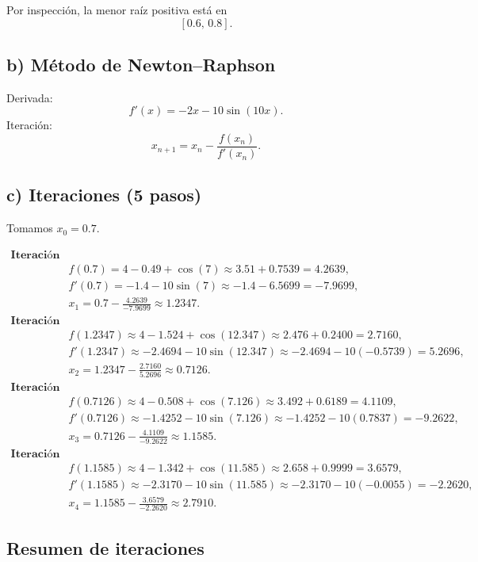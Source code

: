 \documentclass[12pt]{article}
\begin{document}
\begin{center}
Por inspección, la menor raíz positiva está en
\[
\boxed{[0.6,\,0.8]}.
\]

\subsection*{b) Método de Newton–Raphson}

Derivada:
\[
f'(x) = -2x - 10\sin(10x).
\]
Iteración:
\[
x_{n+1} = x_n - \frac{f(x_n)}{f'(x_n)}.
\]

\subsection*{c) Iteraciones (5 pasos)}

Tomamos \(x_0 = 0.7\).  

\begin{align*}
\textbf{Iteración 0:}\\
&f(0.7) = 4 - 0.49 + \cos(7) \approx 3.51 + 0.7539 = 4.2639,\\
&f'(0.7) = -1.4 -10\sin(7)\approx -1.4 - 6.5699 = -7.9699,\\
&x_1 = 0.7 - \frac{4.2639}{-7.9699} \approx 1.2347.\\[0.5em]
\textbf{Iteración 1:}\\
&f(1.2347) \approx 4 -1.524 + \cos(12.347)\approx 2.476 + 0.2400 = 2.7160,\\
&f'(1.2347)\approx -2.4694 -10\sin(12.347)\approx -2.4694 - 10(-0.5739)=5.2696,\\
&x_2 = 1.2347 - \frac{2.7160}{5.2696}\approx 0.7126.\\[0.5em]
\textbf{Iteración 2:}\\
&f(0.7126) \approx 4 -0.508 + \cos(7.126)\approx 3.492 + 0.6189=4.1109,\\
&f'(0.7126)\approx -1.4252 - 10\sin(7.126)\approx -1.4252 -10(0.7837)=-9.2622,\\
&x_3 = 0.7126 - \frac{4.1109}{-9.2622}\approx 1.1585.\\[0.5em]
\textbf{Iteración 3:}\\
&f(1.1585)\approx 4 -1.342 + \cos(11.585)\approx 2.658 + 0.9999=3.6579,\\
&f'(1.1585)\approx -2.3170 -10\sin(11.585)\approx -2.3170 -10(-0.0055)=-2.2620,\\
&x_4 = 1.1585 - \frac{3.6579}{-2.2620}\approx 2.7910.
\end{align*}

\subsection*{Resumen de iteraciones}


\end{center}
\end{document}
